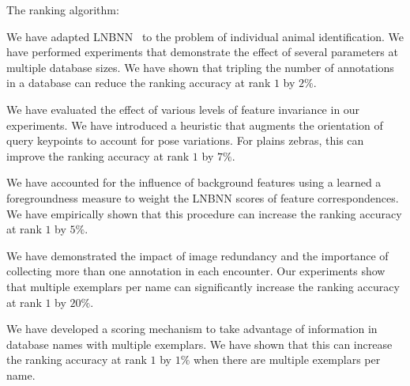     \begin{enumln}
    \item {The ranking algorithm}:
        \begin{enumln}
        \item
        We have adapted LNBNN~\cite{mccann_local_2012} to the problem of individual animal identification.
        We have performed experiments that demonstrate the effect of several parameters at multiple database
          sizes.
        We have shown that tripling the number of annotations in a database can reduce the ranking accuracy at
          rank $1$ by $2\percent$.

        \item
        We have evaluated the effect of various levels of feature invariance in our experiments.
        We have introduced a heuristic that augments the orientation of query keypoints to account for pose
          variations.
        For plains zebras, this can improve the ranking accuracy at rank $1$ by $7\percent$.

        \item
        We have accounted for the influence of background features using a learned a foregroundness measure to
          weight the LNBNN scores of feature correspondences.
        We have empirically shown that this procedure can increase the ranking accuracy at rank $1$ by
          $5\percent$.


        \item We have demonstrated the impact of image redundancy and the importance of collecting more than one
          annotation in each encounter.
        Our experiments show that multiple exemplars per name can significantly increase the ranking accuracy at
          rank $1$ by $20\percent$.

        \item We have developed a \name{} scoring mechanism to take advantage of information in database names
          with multiple exemplars.
        We have shown that this can increase the ranking accuracy at rank $1$ by $1\percent$ when there are
          multiple exemplars per name.
        \end{enumln}


\end{enumln}
